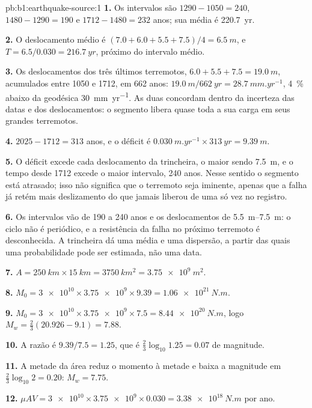 \begin{solution}{pb:b1:earthquake-source:1}
\textbf{1.} Os intervalos são $1290 - 1050 = 240$, $1480 - 1290 = 190$ e
$1712 - 1480 = 232$ anos; sua média é \qty{220.7}{yr}.

\textbf{2.} O deslocamento médio é $(7.0 + 6.0 + 5.5 + 7.5)/4 = \qty{6.5}{m}$, e
$T = 6.5/0.030 = \qty{216.7}{yr}$, próximo do intervalo médio.

\textbf{3.} Os deslocamentos dos três últimos terremotos, $6.0 + 5.5 + 7.5 =
\qty{19.0}{m}$, acumulados entre 1050 e 1712, em 662 anos: $\qty{19.0}{m}
/\qty{662}{yr} = \qty{28.7}{mm.yr^{-1}}$, \qty{4}{\percent} abaixo da geodésica \qty{30}{mm.yr^{-1}}. As duas concordam dentro da incerteza das datas e dos deslocamentos: o segmento libera quase toda a sua carga em seus grandes terremotos.

\textbf{4.} $2025 - 1712 = 313$ anos, e o déficit é
$\qty{0.030}{m.yr^{-1}}\times\qty{313}{yr} = \qty{9.39}{m}$.

\textbf{5.} O déficit excede cada deslocamento da trincheira, o maior sendo \qty{7.5}{m}, e o tempo desde 1712 excede o maior intervalo, 240 anos. Nesse sentido o segmento está atrasado; isso não significa que o terremoto seja iminente, apenas que a falha já retém mais deslizamento do que jamais liberou de uma só vez no registro.

\textbf{6.} Os intervalos vão de 190 a 240 anos e os deslocamentos de
\qtyrange{5.5}{7.5}{m}: o ciclo não é periódico, e a resistência da falha no próximo terremoto é desconhecida. A trincheira dá uma média e uma dispersão, a partir das quais uma probabilidade pode ser estimada, não uma data.

\textbf{7.} $A = \qty{250}{km}\times\qty{15}{km} = \qty{3750}{km^2} =
\qty{3.75e9}{m^2}$.

\textbf{8.} $M_0 = \num{3e10}\times\num{3.75e9}\times\num{9.39} =
\qty{1.06e21}{N.m}$.

\textbf{9.} $M_0 = \num{3e10}\times\num{3.75e9}\times\num{7.5} =
\qty{8.44e20}{N.m}$, logo $M_w = \tfrac23(20.926 - 9.1) = 7.88$.

\textbf{10.} A razão é $9.39/7.5 = 1.25$, que é $\tfrac23\log_{10}1.25 =
0.07$ de magnitude.

\textbf{11.} A metade da área reduz o momento à metade e baixa a magnitude em
$\tfrac23\log_{10}2 = 0.20$: $M_w = 7.75$.

\textbf{12.} $\mu A V = \num{3e10}\times\num{3.75e9}\times\num{0.030} =
\qty{3.38e18}{N.m}$ por ano.


\end{solution}
